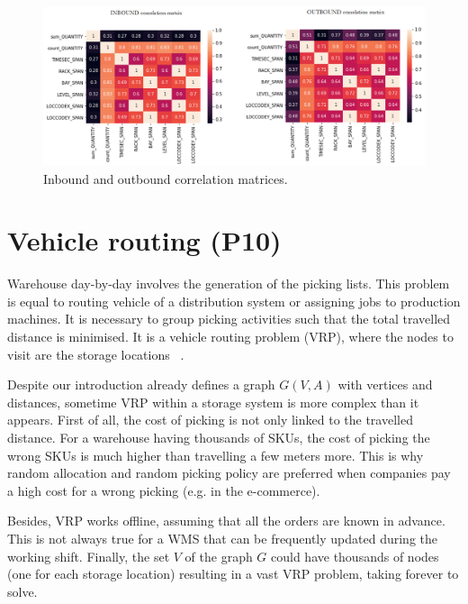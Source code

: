 \begin{figure}[hbt!]
\centering
\includegraphics[width=1.0\textwidth]{SectionWarehouses/control_figures/fig_pick_corr.png}
\captionsetup{type=figure}
\caption{Inbound and outbound correlation matrices.}
\label{fig_pick_corr}
\end{figure}

\clearpage


\section{Vehicle routing (P10)}
Warehouse day-by-day involves the generation of the picking lists. This problem is equal to routing vehicle of a distribution system or assigning jobs to production machines. It is necessary to group picking activities such that the total travelled distance is minimised. It is a vehicle routing problem (VRP), where the nodes to visit are the storage locations ~\cite{Ratliff1983}.\par

Despite our introduction already defines a graph $G(V,A)$ with vertices and distances, sometime VRP within a storage system is more complex than it appears. First of all, the cost of picking is not only linked to the travelled distance. For a warehouse having thousands of SKUs, the cost of picking the wrong SKUs is much higher than travelling a few meters more. This is why random allocation and random picking policy are preferred when companies pay a high cost for a wrong picking (e.g. in the e-commerce).\par

Besides, VRP works offline, assuming that all the orders are known in advance. This is not always true for a WMS that can be frequently updated during the working shift. Finally, the set $V$ of the graph $G$ could have thousands of nodes (one for each storage location) resulting in a vast VRP problem, taking forever to solve.\par


